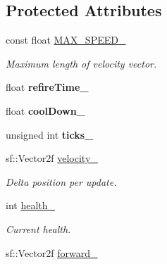 \subsection*{Protected Attributes}
\begin{DoxyCompactItemize}
\item 
\hypertarget{class_ship_a6843554ddc3c0098bcc9d17f7a7fbf3b}{}const float \hyperlink{class_ship_a6843554ddc3c0098bcc9d17f7a7fbf3b}{M\+A\+X\+\_\+\+S\+P\+E\+E\+D\+\_\+}\label{class_ship_a6843554ddc3c0098bcc9d17f7a7fbf3b}

\begin{DoxyCompactList}\small\item\em Maximum length of velocity vector. \end{DoxyCompactList}\item 
\hypertarget{class_ship_a81d6b0cb2ba9cfbee65844d237f9ab5b}{}float {\bfseries refire\+Time\+\_\+}\label{class_ship_a81d6b0cb2ba9cfbee65844d237f9ab5b}

\item 
\hypertarget{class_ship_a2fcce9e29f267aa642555fb74c349187}{}float {\bfseries cool\+Down\+\_\+}\label{class_ship_a2fcce9e29f267aa642555fb74c349187}

\item 
\hypertarget{class_ship_ade95fc0845ea4a025c655671617f91d8}{}unsigned int {\bfseries ticks\+\_\+}\label{class_ship_ade95fc0845ea4a025c655671617f91d8}

\item 
\hypertarget{class_ship_ac1584ef024d6ed1538eb2d1e99661557}{}sf\+::\+Vector2f \hyperlink{class_ship_ac1584ef024d6ed1538eb2d1e99661557}{velocity\+\_\+}\label{class_ship_ac1584ef024d6ed1538eb2d1e99661557}

\begin{DoxyCompactList}\small\item\em Delta position per update. \end{DoxyCompactList}\item 
\hypertarget{class_ship_af9523b2053ac0164fa6c702aa1a1165e}{}int \hyperlink{class_ship_af9523b2053ac0164fa6c702aa1a1165e}{health\+\_\+}\label{class_ship_af9523b2053ac0164fa6c702aa1a1165e}

\begin{DoxyCompactList}\small\item\em Current health. \end{DoxyCompactList}\item 
\hypertarget{class_ship_a152b38aa89be58f3037f82c408ff28c9}{}sf\+::\+Vector2f \hyperlink{class_ship_a152b38aa89be58f3037f82c408ff28c9}{forward\+\_\+}\label{class_ship_a152b38aa89be58f3037f82c408ff28c9}


\end{DoxyCompactItemize}
